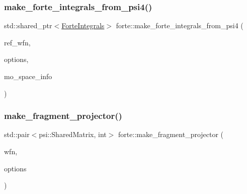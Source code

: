 \mbox{\label{namespaceforte_a2e54c8c0a99b34eb6ce33f3eb7b48f07}} 
\subsubsection{\texorpdfstring{make\+\_\+forte\+\_\+integrals\+\_\+from\+\_\+psi4()}{make\_forte\_integrals\_from\_psi4()}\hspace{0.1cm}{\footnotesize\ttfamily [2/2]}}
{\footnotesize\ttfamily std\+::shared\+\_\+ptr$<$\mbox{\hyperlink{classforte_1_1_forte_integrals}{Forte\+Integrals}}$>$ forte\+::make\+\_\+forte\+\_\+integrals\+\_\+from\+\_\+psi4 (\begin{DoxyParamCaption}\item[{std\+::shared\+\_\+ptr$<$ psi\+::\+Wavefunction $>$}]{ref\+\_\+wfn,  }\item[{std\+::shared\+\_\+ptr$<$ \mbox{\hyperlink{classforte_1_1_forte_options}{Forte\+Options}} $>$}]{options,  }\item[{std\+::shared\+\_\+ptr$<$ \mbox{\hyperlink{classforte_1_1_m_o_space_info}{M\+O\+Space\+Info}} $>$}]{mo\+\_\+space\+\_\+info }\end{DoxyParamCaption})}

\mbox{\label{namespaceforte_a5610c10fefce9236336c84c729fa2258}} 
\subsubsection{\texorpdfstring{make\+\_\+fragment\+\_\+projector()}{make\_fragment\_projector()}\hspace{0.1cm}{\footnotesize\ttfamily [1/2]}}
{\footnotesize\ttfamily std\+::pair$<$psi\+::\+Shared\+Matrix, int$>$ forte\+::make\+\_\+fragment\+\_\+projector (\begin{DoxyParamCaption}\item[{Shared\+Wavefunction}]{wfn,  }\item[{std\+::shared\+\_\+ptr$<$ \mbox{\hyperlink{classforte_1_1_forte_options}{Forte\+Options}} $>$}]{options }\end{DoxyParamCaption})}

